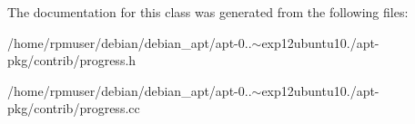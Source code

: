 \-The documentation for this class was generated from the following files\-:\begin{DoxyCompactItemize}
\item 
/home/rpmuser/debian/debian\-\_\-apt/apt-\/0..$\sim$exp12ubuntu10./apt-\/pkg/contrib/progress.\-h\item 
/home/rpmuser/debian/debian\-\_\-apt/apt-\/0..$\sim$exp12ubuntu10./apt-\/pkg/contrib/progress.\-cc\end{DoxyCompactItemize}

